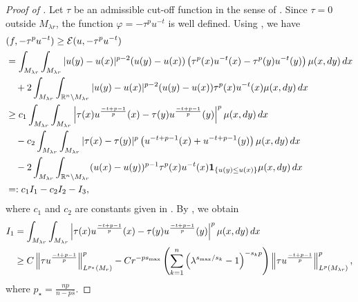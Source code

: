 \documentclass[10pt,a4paper]{amsart}
\renewcommand{\d}{\textnormal{d}}
\begin{document}
\begin{proof} [Proof of ]
Let $\tau$ be an admissible cut-off function in the sense of . Since $\tau = 0$ outside $M_{\lambda r}$, the function $\varphi = -\tau^p u^{-t}$ is well defined. Using , we have
\begin{equation*}
\begin{split}
&(f, -\tau^p u^{-t}) \geq \mathcal{E}(u, -\tau^p u^{-t}) \\
&= \int_{M_{\lambda r}} \int_{M_{\lambda r}} |u(y)-u(x)|^{p-2} (u(y)-u(x)) \left( \tau^p(x) u^{-t}(x) - \tau^p(y) u^{-t}(y) \right) \mu(x, \d y)\, \d x \\
&\quad + 2 \int_{M_{\lambda r}} \int_{\mathbb{R}^n \setminus M_{\lambda r}} |u(y)-u(x)|^{p-2} (u(y)-u(x)) \tau^p(x) u^{-t}(x) \mu(x, \d y)\, \d x \\
&\geq c_1 \int_{M_{\lambda r}} \int_{M_{\lambda r}} \left| \tau(x) u^{\frac{-t+p-1}{p}} (x) - \tau(y) u^{\frac{-t+p-1}{p}}(y) \right|^p \mu(x, \d y)\, \d x \\
&\quad - c_2 \int_{M_{\lambda r}} \int_{M_{\lambda r}} |\tau(x)-\tau(y)|^p \left( u^{-t+p-1}(x) + u^{-t+p-1}(y) \right) \mu(x, \d y)\, \d x \\
&\quad - 2 \int_{M_{\lambda r}} \int_{\mathbb{R}^n \setminus M_{\lambda r}} (u(x)-u(y))^{p-1} \tau^p(x) u^{-t}(x) {\bf 1}_{\lbrace u(y) \leq u(x) \rbrace} \mu(x, \d y)\, \d x \\
&=: c_1 I_1 - c_2 I_2 - I_3,
\end{split}
\end{equation*}
where $c_1$ and $c_2$ are constants given in . 
By , we obtain
\begin{equation*}
\begin{split}
I_1
&= \int_{M_{\lambda r}} \int_{M_{\lambda r}} \left| \tau(x) u^{\frac{-t+p-1}{p}} (x) - \tau(y) u^{\frac{-t+p-1}{p}}(y) \right|^p \mu(x, \d y)\, \d x \\
&\geq C\left\|\tau u^{\frac{-t+p-1}{p}} \right\|_{L^{p_{\star}}(M_{r})}^p -C r^{-ps_{\max}}\left( \sum_{k=1}^n \left( \lambda^{s_{\max}/s_k}-1 \right)^{-s_k p} \right) \left\|\tau u^{\frac{-t+p-1}{p}}\right\|_{L^p(M_{\lambda r})}^p,
\end{split}
\end{equation*}
where
$ p_{\star} = \frac{np}{n-p\bar{s}}$.


\end{proof}
\end{document}
